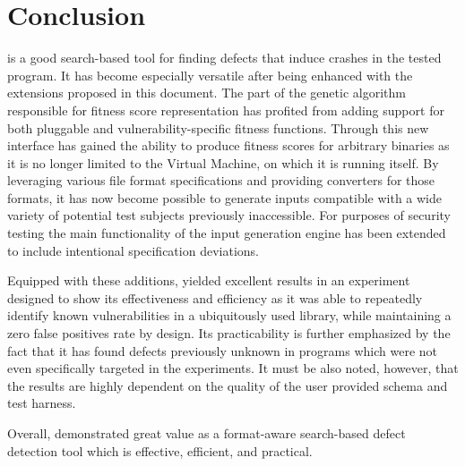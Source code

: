 \section{Conclusion}
\label{sec:conclusion}
\xmlmate is a good search-based tool for finding defects that induce crashes in the tested program. It has
become especially versatile after being enhanced with the extensions proposed in this document.
The part of the genetic algorithm responsible for fitness score representation has profited from adding
support for both pluggable and vulnerability-specific fitness functions. Through this new interface \xmlmate
has gained the ability to produce fitness scores for arbitrary binaries as it is no longer limited to
the \java Virtual Machine, on which it is running itself. By leveraging various file format specifications and
providing converters for those formats, it has now become possible to generate inputs compatible with a wide
variety of potential test subjects previously inaccessible. For purposes of security testing the main
functionality of the input generation engine has been extended to include intentional specification deviations.

Equipped with these additions, \xmlmate yielded excellent results in an experiment designed to show its
effectiveness and efficiency as it was able to repeatedly identify known vulnerabilities in a ubiquitously
used library, while maintaining a zero false positives rate by design.
Its practicability is further emphasized by the fact that it has found defects previously unknown in programs
which were not even specifically targeted in the experiments. 
It must be also noted, however, that the results are highly dependent on the quality of the user provided
schema and test harness.

\begin{mdframed}
Overall, \xmlmate demonstrated great value as a format-aware search-based defect detection tool which
is effective, efficient, and practical.
\end{mdframed}